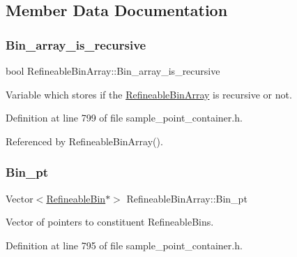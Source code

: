 \subsection{Member Data Documentation}
\mbox{\label{classRefineableBinArray_af36bed0c24cd70af160db504a3160d0b}} 
\subsubsection{\texorpdfstring{Bin\+\_\+array\+\_\+is\+\_\+recursive}{Bin\_array\_is\_recursive}}
{\footnotesize\ttfamily bool Refineable\+Bin\+Array\+::\+Bin\+\_\+array\+\_\+is\+\_\+recursive\hspace{0.3cm}{\ttfamily [private]}}



Variable which stores if the \hyperlink{classRefineableBinArray}{Refineable\+Bin\+Array} is recursive or not. 



Definition at line 799 of file sample\+\_\+point\+\_\+container.\+h.



Referenced by Refineable\+Bin\+Array().

\mbox{\label{classRefineableBinArray_a164db8709f15119c8c5a761e9715d1a4}} 
\subsubsection{\texorpdfstring{Bin\+\_\+pt}{Bin\_pt}}
{\footnotesize\ttfamily Vector$<$\hyperlink{classRefineableBin}{Refineable\+Bin}$\ast$$>$ Refineable\+Bin\+Array\+::\+Bin\+\_\+pt\hspace{0.3cm}{\ttfamily [private]}}



Vector of pointers to constituent Refineable\+Bins. 



Definition at line 795 of file sample\+\_\+point\+\_\+container.\+h.



